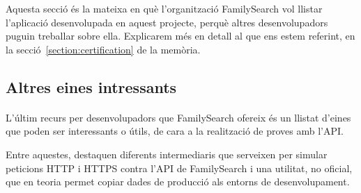         Aquesta secció és la mateixa en què l'organització FamilySearch vol llistar l'aplicació desenvolupada en aquest projecte, perquè altres desenvolupadors puguin treballar sobre ella. Explicarem més en detall al que ens estem referint, en la secció~\ref{section:certification} de la memòria.


    \subsection{Altres eines intressants}

        \paragraph{}
        L'últim recurs per desenvolupadors que FamilySearch ofereix és un llistat d'eines que poden ser interessants o útils, de cara a la realització de proves amb l'API.

        Entre aquestes, destaquen diferents intermediaris que serveixen per simular peticions HTTP i HTTPS contra l'API de FamilySearch i una utilitat, no oficial, que en teoria permet copiar dades de producció als entorns de desenvolupament.
